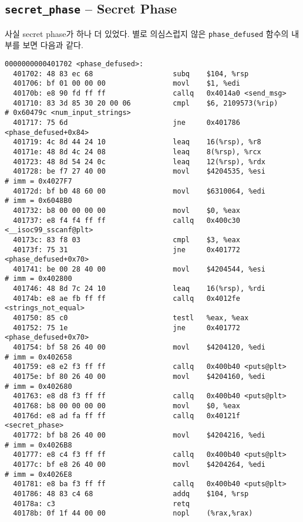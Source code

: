 \documentclass{scrartcl}
\begin{document}
\subsection{\texttt{secret\_phase} -- Secret Phase}
사실 secret phase가 하나 더 있었다. 별로 의심스럽지 않은
\texttt{phase\_defused} 함수의 내부를 보면 다음과 같다.
\begin{lstlisting}
0000000000401702 <phase_defused>:
  401702: 48 83 ec 68                   subq    $104, %rsp
  401706: bf 01 00 00 00                movl    $1, %edi
  40170b: e8 90 fd ff ff                callq   0x4014a0 <send_msg>
  401710: 83 3d 85 30 20 00 06          cmpl    $6, 2109573(%rip)       # 0x60479c <num_input_strings>
  401717: 75 6d                         jne     0x401786 <phase_defused+0x84>
  401719: 4c 8d 44 24 10                leaq    16(%rsp), %r8
  40171e: 48 8d 4c 24 08                leaq    8(%rsp), %rcx
  401723: 48 8d 54 24 0c                leaq    12(%rsp), %rdx
  401728: be f7 27 40 00                movl    $4204535, %esi          # imm = 0x4027F7
  40172d: bf b0 48 60 00                movl    $6310064, %edi          # imm = 0x6048B0
  401732: b8 00 00 00 00                movl    $0, %eax
  401737: e8 f4 f4 ff ff                callq   0x400c30 <__isoc99_sscanf@plt>
  40173c: 83 f8 03                      cmpl    $3, %eax
  40173f: 75 31                         jne     0x401772 <phase_defused+0x70>
  401741: be 00 28 40 00                movl    $4204544, %esi          # imm = 0x402800
  401746: 48 8d 7c 24 10                leaq    16(%rsp), %rdi
  40174b: e8 ae fb ff ff                callq   0x4012fe <strings_not_equal>
  401750: 85 c0                         testl   %eax, %eax
  401752: 75 1e                         jne     0x401772 <phase_defused+0x70>
  401754: bf 58 26 40 00                movl    $4204120, %edi          # imm = 0x402658
  401759: e8 e2 f3 ff ff                callq   0x400b40 <puts@plt>
  40175e: bf 80 26 40 00                movl    $4204160, %edi          # imm = 0x402680
  401763: e8 d8 f3 ff ff                callq   0x400b40 <puts@plt>
  401768: b8 00 00 00 00                movl    $0, %eax
  40176d: e8 ad fa ff ff                callq   0x40121f <secret_phase>
  401772: bf b8 26 40 00                movl    $4204216, %edi          # imm = 0x4026B8
  401777: e8 c4 f3 ff ff                callq   0x400b40 <puts@plt>
  40177c: bf e8 26 40 00                movl    $4204264, %edi          # imm = 0x4026E8
  401781: e8 ba f3 ff ff                callq   0x400b40 <puts@plt>
  401786: 48 83 c4 68                   addq    $104, %rsp
  40178a: c3                            retq
  40178b: 0f 1f 44 00 00                nopl    (%rax,%rax)
\end{lstlisting}
\end{document}
